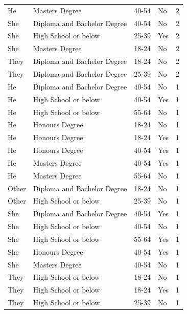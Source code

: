 \documentclass[]{interact}
\theoremstyle{plain}%
\theoremstyle{definition}
\theoremstyle{remark}
\begin{document}
\begin{table}
\begin{tabular}[t]{llllr}
He & Masters Degree & 40-54 & No & 2\\
She & Diploma and Bachelor Degree & 40-54 & No & 2\\
She & High School or below & 25-39 & Yes & 2\\
She & Masters Degree & 18-24 & No & 2\\
They & Diploma and Bachelor Degree & 18-24 & No & 2\\
They & Diploma and Bachelor Degree & 25-39 & No & 2\\
He & Diploma and Bachelor Degree & 40-54 & No & 1\\
He & High School or below & 40-54 & Yes & 1\\
He & High School or below & 55-64 & No & 1\\
He & Honours Degree & 18-24 & No & 1\\
He & Honours Degree & 18-24 & Yes & 1\\
He & Honours Degree & 40-54 & Yes & 1\\
He & Masters Degree & 40-54 & Yes & 1\\
He & Masters Degree & 55-64 & No & 1\\
Other & Diploma and Bachelor Degree & 18-24 & No & 1\\
Other & High School or below & 25-39 & No & 1\\
She & Diploma and Bachelor Degree & 40-54 & Yes & 1\\
She & High School or below & 40-54 & No & 1\\
She & High School or below & 55-64 & Yes & 1\\
She & Honours Degree & 40-54 & Yes & 1\\
She & Masters Degree & 40-54 & No & 1\\
They & High School or below & 18-24 & No & 1\\
They & High School or below & 18-24 & Yes & 1\\
They & High School or below & 25-39 & No & 1\\
\bottomrule
\end{tabular}
\end{table}
\end{document}
